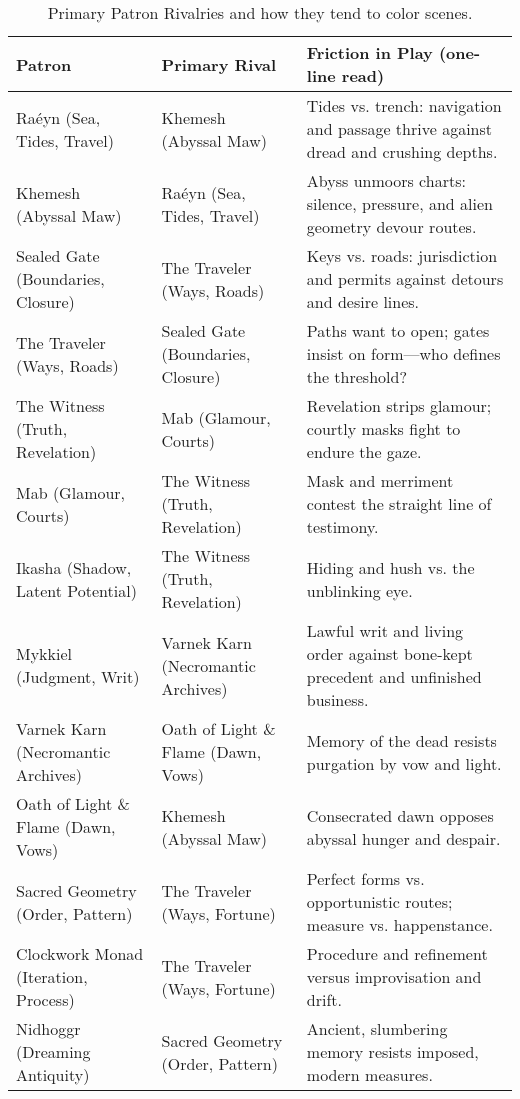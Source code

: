 \begin{table}[h!]
  \centering
  \renewcommand{\arraystretch}{1.15}
  \begin{tabular}{@{}p{3.4cm}p{3.4cm}p{8.2cm}@{}}
    \toprule
    \textbf{Patron} & \textbf{Primary Rival} & \textbf{Friction in Play (one-line read)} \\
    \midrule
    Raéyn (Sea, Tides, Travel) & Khemesh (Abyssal Maw) & Tides vs. trench: navigation and passage thrive against dread and crushing depths. \\
    Khemesh (Abyssal Maw) & Raéyn (Sea, Tides, Travel) & Abyss unmoors charts: silence, pressure, and alien geometry devour routes. \\
    Sealed Gate (Boundaries, Closure) & The Traveler (Ways, Roads) & Keys vs. roads: jurisdiction and permits against detours and desire lines. \\
    The Traveler (Ways, Roads) & Sealed Gate (Boundaries, Closure) & Paths want to open; gates insist on form—who defines the threshold? \\
    The Witness (Truth, Revelation) & Mab (Glamour, Courts) & Revelation strips glamour; courtly masks fight to endure the gaze. \\
    Mab (Glamour, Courts) & The Witness (Truth, Revelation) & Mask and merriment contest the straight line of testimony. \\
    Ikasha (Shadow, Latent Potential) & The Witness (Truth, Revelation) & Hiding and hush vs. the unblinking eye. \\
    Mykkiel (Judgment, Writ) & Varnek Karn (Necromantic Archives) & Lawful writ and living order against bone-kept precedent and unfinished business. \\
    Varnek Karn (Necromantic Archives) & Oath of Light \& Flame (Dawn, Vows) & Memory of the dead resists purgation by vow and light. \\
    Oath of Light \& Flame (Dawn, Vows) & Khemesh (Abyssal Maw) & Consecrated dawn opposes abyssal hunger and despair. \\
    Sacred Geometry (Order, Pattern) & The Traveler (Ways, Fortune) & Perfect forms vs. opportunistic routes; measure vs. happenstance. \\
    Clockwork Monad (Iteration, Process) & The Traveler (Ways, Fortune) & Procedure and refinement versus improvisation and drift. \\
    Nidhoggr (Dreaming Antiquity) & Sacred Geometry (Order, Pattern) & Ancient, slumbering memory resists imposed, modern measures. \\
    \bottomrule
  \end{tabular}
  \caption{Primary Patron Rivalries and how they tend to color scenes.}
\end{table}
